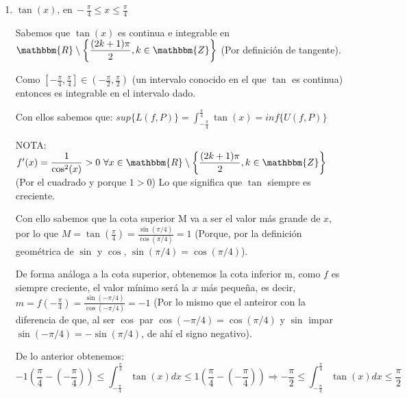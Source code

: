 \documentclass[12pt]{article}
\begin{document}
\begin{enumerate}[\hspace{9px} a)]
        Ahora para la cota inferior m: Sabemos que el valor mínimo que puede obtener la función es $f(0)=0$ y como \(0\in[-4,4]\) entoces $m=0$.\bigskip

        De lo anterior, se sigue que:
        \[0(4-(-4)) \leq \int_{-4}^{4}x^4dx \leq 256(4-(-4)) \Rightarrow 0\leq \int_{-4}^{4}x^4dx \leq 256(8)\]

    \item \(\tan(x) \text{, en} \ -\displaystyle\frac{\pi}{4} \leq x \leq \frac{\pi}{4}\) \bigskip

        Sabemos que $\tan(x)$ es continua e integrable en \(\mathbbm{R}\setminus\displaystyle\left\{\frac{(2k+1)\pi}{2}, k\in\mathbbm{Z}\right\}\) (Por definici\'on de tangente).\bigskip
        
        Como \(\left[-\displaystyle\frac{\pi}{4},\frac{\pi}{4}\right]\in\left(-\displaystyle\frac{\pi}{2},\frac{\pi}{2}\right)\) (un intervalo conocido en el que $\tan$ es continua) entonces es integrable en el intervalo dado.\bigskip
        
        Con ellos sabemos que: \quad \(sup\{L(f,P)\}=\displaystyle\int_{-\frac{\pi}{4}}^{\frac{\pi}{4}}\tan(x)=inf\{U(f,P)\}\)\bigskip

        NOTA: \(f'(x) = \displaystyle\frac{1}{\cos^2(x)} > 0 \ \forall x \in \mathbbm{R}\setminus\displaystyle\left\{\frac{(2k+1)\pi}{2}, k\in\mathbbm{Z}\right\}\) (Por el cuadrado y porque $1>0$) Lo que significa que $\tan$ siempre es creciente.\bigskip

        Con ello sabemos que la cota superior M va a ser el valor m\'as grande de $x$, por lo que \(M = \tan\left(\displaystyle\frac{\pi}{4}\right)=\displaystyle\frac{\sin(\pi/4)}{\cos(\pi/4)}=1\) (Porque, por la definici\'on geom\'etrica de $\sin$ y $\cos$, \(\sin(\pi/4)=\cos(\pi/4)\)).\bigskip

        De forma an\'aloga a la cota superior, obtenemos la cota inferior m, como $f$ es siempre creciente, el valor m\'inimo ser\'a la $x$ m\'as pequeña, es decir, \(m = f\left(-\displaystyle\frac{\pi}{4}\right) = \displaystyle\frac{\sin(-\pi/4)}{\cos(-\pi/4)}=-1\) (Por lo mismo que el anteiror con la diferencia de que, al ser $\cos$ par \(\cos(-\pi/4)=\cos(\pi/4)\) y $\sin$ impar \(\sin(-\pi/4)=-\sin(\pi/4)\), de ah\'i el signo negativo).\bigskip

        De lo anterior obtenemos:
        \[-1\left(\frac{\pi}{4}-\left(-\frac{\pi}{4}\right)\right) \leq \int_{-\frac{\pi}{4}}^{\frac{\pi}{4}}\tan(x)dx \leq 1\left(\frac{\pi}{4}-\left(-\frac{\pi}{4}\right)\right) \Rightarrow -\frac{\pi}{2} \leq \int_{-\frac{\pi}{4}}^{\frac{\pi}{4}}\tan(x)dx \leq \frac{\pi}{2}\]

\end{enumerate}
\end{document}
